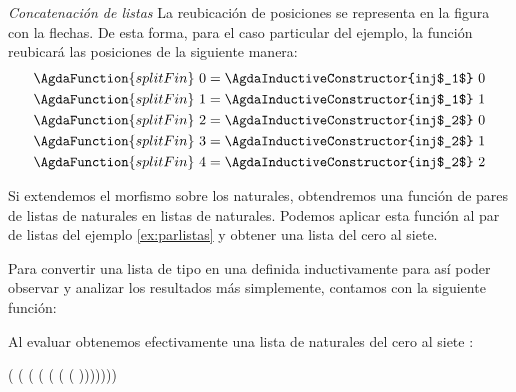 \begin{example}{\it Concatenación de listas}
La reubicación de posiciones se representa en la figura con la flechas. De esta forma, para el caso particular del ejemplo, la función  reubicará las posiciones de la siguiente manera:  
  \begin{align*}
\AgdaFunction{splitFin}\ 0 &= \AgdaInductiveConstructor{inj$_1$}\ {0}\\
\AgdaFunction{splitFin}\ 1 &= \AgdaInductiveConstructor{inj$_1$}\ {1}\\
\AgdaFunction{splitFin}\ 2 &= \AgdaInductiveConstructor{inj$_2$}\ {0}\\      
\AgdaFunction{splitFin}\ 3 &= \AgdaInductiveConstructor{inj$_2$}\ {1}\\
\AgdaFunction{splitFin}\ 4 &= \AgdaInductiveConstructor{inj$_2$}\ {2}
  \end{align*}
  
  Si extendemos el morfismo  sobre los naturales, obtendremos una función de pares de listas de naturales en listas de naturales. Podemos aplicar esta función al par de listas del ejemplo \ref{ex:parlistas} y obtener una lista del cero al siete.
  

Para convertir una lista de tipo  en una definida inductivamente para así poder observar y analizar los resultados más simplemente, contamos con la siguiente función:


Al evaluar  obtenemos efectivamente una lista de naturales del cero al siete :

 \cons ( \cons ( \cons ( \cons ( \cons ( \cons ( \cons ( \cons \AgdaInductiveConstructor{[]})))))))

\end{example}
